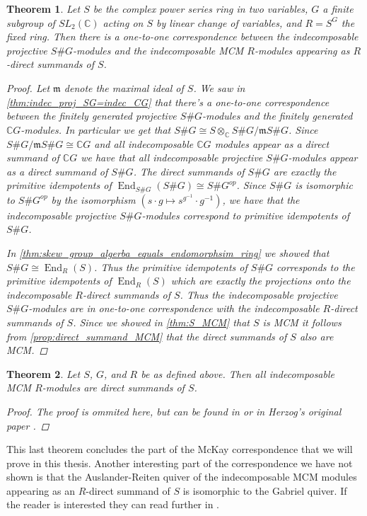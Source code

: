 \documentclass[11pt, a4paper, english]{article}
\newtheorem{theorem}{Theorem}[section]
\theoremstyle{definition}
\newcommand{\C}{\mathbb{C}}
\DeclareMathOperator{\End}{End}
\begin{document}
\begin{theorem}
Let $S$ be the complex power series ring in two variables, $G$ a finite subgroup of $SL_2(\C)$ acting on $S$ by linear change of variables, and $R=S^G$ the fixed ring. Then there is a one-to-one correspondence between the indecomposable projective $S\#G$-modules and the indecomposable MCM $R$-modules appearing as $R$-direct summands of $S$.

\begin{proof}
Let $\mathfrak{m}$ denote the maximal ideal of $S$. We saw in \cref{thm:indec_proj_SG=indec_CG} that there's a one-to-one correspondence between the finitely generated projective $S\#G$-modules and the finitely generated $\C G$-modules. In particular we get that $S\#G \cong S \otimes_\C S\#G/\mathfrak{m}S\#G$. Since $S\#G/\mathfrak{m}S\#G \cong \C G$ and all indecomposable $\C G$ modules appear as a direct summand of $\C G$ we have that all indecomposable projective $S\#G$-modules appear as a direct summand of $S\#G$. The direct summands of $S\#G$ are exactly the primitive idempotents of $\End_{S\#G}(S\#G) \cong S\#G^{op}$. Since $S\#G$ is isomorphic to $S\#G^{op}$ by the isomorphism $(s\cdot g \mapsto s^{g^{-1}} \cdot g^{-1})$, we have that the indecomposable projective $S\#G$-modules correspond to primitive idempotents of $S\#G$.

In \cref{thm:skew_group_algerba_equals_endomorphsim_ring} we showed that $S\#G \cong \End_R(S)$. Thus the primitive idempotents of $S\#G$ corresponds to the primitive idempotents of $\End_R(S)$ which are exactly the projections onto the indecomposable $R$-direct summands of $S$. Thus the indecomposable projective $S\#G$-modules are in one-to-one correspondence with the indecomposable $R$-direct summands of $S$. Since we showed in \cref{thm:S_MCM} that $S$ is MCM it follows from \cref{prop:direct_summand_MCM} that the direct summands of $S$ also are MCM.
\end{proof}
\end{theorem}

\begin{theorem}
Let $S$, $G$, and $R$ be as defined above. Then all indecomposable MCM $R$-modules are direct summands of $S$.
\begin{proof}
The proof is ommited here, but can be found in \cite[Theorem~6.3]{LW12} or in Herzog's original paper \cite{Her78}.
\end{proof}
\end{theorem}

This last theorem concludes the part of the McKay correspondence that we will prove in this thesis. Another interesting part of the correspondence we have not shown is that the Auslander-Reiten quiver of the indecomposable MCM modules appearing as an $R$-direct summand of $S$ is isomorphic to the Gabriel quiver. If the reader is interested they can read further in \cite[Chapter~5, Chapter~6, Chapter~13]{LW12}.
\end{document}
